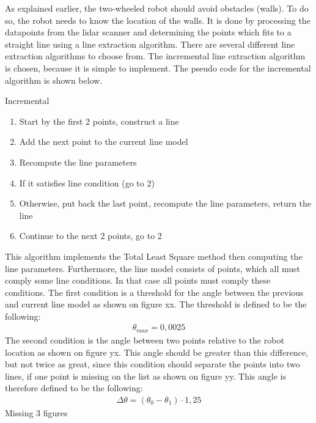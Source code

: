 \documentclass[../Head/Main.tex]{subfiles}
\begin{document}
As explained earlier, the two-wheeled robot should avoid obstacles (walls). To do so, the robot needs to know the location of the walls. It is done by processing the datapoints from the lidar scanner and determining the points which fits to a straight line using a line extraction algorithm. There are several different line extraction algorithms to choose from. The incremental line extraction algorithm is chosen, because it is simple to implement. The pseudo code for the incremental algorithm is shown below. \par
\begin{Pseudo}{Incremental}{}
	\begin{enumerate}
		\item Start by the first 2 points, construct a 				line
		\item Add the next point to the current line model
		\item Recompute the line parameters
		\item If it satisfies line condition (go to 2)
		\item Otherwise, put back the last point, 					recompute the line parameters, return the line
		\item Continue to the next 2 points, go to 2
	\end{enumerate}
\end{Pseudo}
This algorithm implements the Total Least Square method then computing the line parameters. Furthermore, the line model consists of points, which all must comply some line conditions. In that case all points must comply these conditions. The first condition is a threshold for the angle between the previous and current line model as shown on figure xx. The threshold is defined to be the following:
\begin{align*}
	\theta_{max} = 0,0025
\end{align*}
The second condition is the angle between two points relative to the robot location as shown on figure yx. This angle should be greater than this difference, but not twice as great, since this condition should separate the points into two lines, if one point is missing on the list as shown on figure yy. This angle is therefore defined to be the following:
\begin{align*}
	\Delta\theta = \left(\theta_0 - \theta_1\right)\cdot 1,25
\end{align*}
{\color{red} Missing 3 figures} \par
\end{document}
